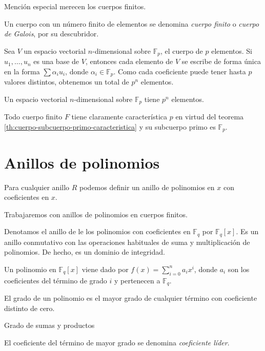 
Mención especial merecen los cuerpos finitos.

Un cuerpo con un número finito de elementos se denomina \textit{cuerpo finito} o \textit{cuerpo de Galois}, por su descubridor.

Sea \(V\) un espacio vectorial \(n\)-dimensional sobre \(\mathbb F_p\), el cuerpo de \(p\) elementos.
Si \(u_1, \dots, u_n\) es una base de \(V\), entonces cada elemento de \(V\) se escribe de forma única en la forma \(\sum \alpha_iu_i\), donde \(\alpha_i \in \mathbb F_p\).
Como cada coeficiente puede tener hasta \(p\) valores distintos, obtenemos un total de \(p^n\) elementos.

\begin{lemma}
  Un espacio vectorial \(n\)-dimensional sobre \(\mathbb F_p\) tiene \(p^n\) elementos.
\end{lemma}

Todo cuerpo finito \(F\) tiene claramente característica \(p\) en virtud del teorema \ref{th:cuerpo-subcuerpo-primo-caracteristica} y su subcuerpo primo es \(\mathbb F_p\).

\section{Anillos de polinomios}

Para cualquier anillo \(R\) podemos definir un anillo de polinomios en \(x\) con coeficientes en \(x\).

Trabajaremos con anillos de polinomios en cuerpos finitos.

Denotamos el anillo de le los polinomios con coeficientes en \(\mathbb F_q\) por \(\mathbb F_q[x]\).
Es un anillo conmutativo con las operaciones habituales de suma y multiplicación de polinomios.
De hecho, es un dominio de integridad.

Un polinomio en \(\mathbb F_q[x]\) viene dado por \(f(x) = \sum_{i=0}^n a_ix^i\), donde \(a_i\) son los coeficientes del término de grado \(i\) y pertenecen a \(\mathbb F_q\).

El grado de un polinomio es el mayor grado de cualquier término con coeficiente distinto de cero.

\begin{proposition}
  Grado de sumas y productos
\end{proposition}

El coeficiente del término de mayor grado se denomina \textit{coeficiente líder}.

